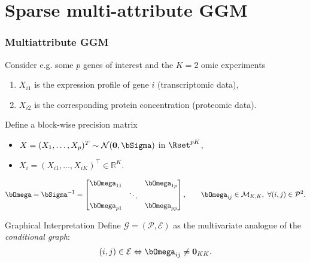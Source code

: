 \section{Sparse multi-attribute GGM}

\begin{frame}
  \frametitle{Multiattribute GGM}

    Consider e.g. some $p$ genes of interest and the $K=2$ omic experiments
    \begin{enumerate}
    \item $X_{i1}$ is the expression profile of gene $i$ (transcriptomic data),
    \item $X_{i2}$ is the corresponding protein concentration (proteomic data).
    \end{enumerate}

    \vfill

  \begin{block}{Define a block-wise precision matrix}
      \vspace{-.25cm}
      \begin{itemize}
      \item  $X =  (X_1,  \dots,  X_p)^T \sim  \mathcal{N}(\mathbf{0},
        \bSigma)$ in $\Rset^{pK}$,
      \item $X_i=(X_{i1},\dots,X_{iK})^\intercal \in \mathbb{R}^K$.
      \end{itemize}
      \[
      \invcov = \bSigma^{-1} = \begin{bmatrix}
        \invcov_{11} & & \invcov_{1p} \\
        & \ddots & \\
        \invcov_{p1} & & \invcov_{pp} \\
      \end{bmatrix}, \qquad  \invcov_{ij} \in \mathcal{M}_{K,K},
      \ \forall (i,j)\in\mathcal{P}^2.
      \]
    \end{block}

    \vfill

    \begin{beamerboxesrounded}[upper=sur:head,lower=sur:bloc,shadow=true]{Graphical Interpretation}
      Define  $\mathcal{G}=(\mathcal{P},\mathcal{E})$   as  \alert{the
        multivariate analogue} of the {\it conditional graph}:
      \vspace{-.25cm}
      \begin{equation*}
        (i,j)\in    \mathcal{E}    \Leftrightarrow    \invcov_{ij}    \ne
        \mathbf{0}_{KK}.
      \end{equation*}
    \end{beamerboxesrounded}

\end{frame}


